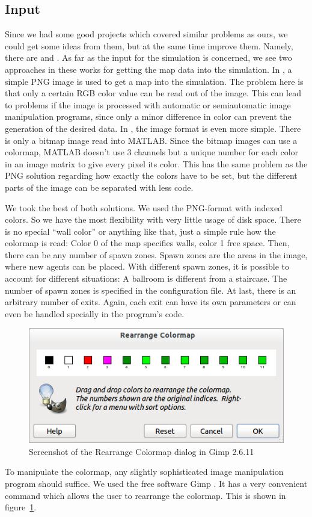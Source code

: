 \documentclass[11pt]{article}
\begin{document}
\subsection{Input} Since we had some good projects which covered similar
problems as ours, we could get some ideas from them, but at the same time
improve them.  Namely, there are \cite{multilevel} and \cite{airplane}.  As far
as the input for the simulation is concerned, we see two approaches in these
works for getting the map data into the simulation.  In \cite{multilevel}, a
simple PNG image is used to get a map into the simulation. The problem here is
that only a certain RGB color value can be read out of the image.  This can
lead to problems if the image is processed with automatic or semiautomatic
image manipulation programs, since only a minor difference in color can prevent
the generation of the desired data.  In \cite{airplane}, the image format is
even more simple.  There is only a bitmap image read into MATLAB.  Since the
bitmap images can use a colormap, MATLAB doesn't use 3 channels but a unique
number for each color in an image matrix to give every pixel its color.  This
has the same problem as the PNG solution regarding how exactly the colors have
to be set, but the different parts of the image can be separated with less
code.

We took the best of both solutions. We used the PNG-format with indexed colors.
So we have the most flexibility with very little usage of disk space.  There is
no special ``wall color'' or anything like that, just a simple rule how the
colormap is read: Color 0 of the map specifies walls, color 1 free space.
Then, there can be any number of spawn zones.  Spawn zones are the areas in the
image, where new agents can be placed. With different spawn zones, it is
possible to account for different situations: A ballroom is different from a
staircase.  The number of spawn zones is specified in the configuration file.
At last, there is an arbitrary number of exits.  Again, each exit can have its
own parameters or can even be handled specially in the program's code. 

\begin{figure}[h]
	\centering
	\includegraphics[scale=0.5]{images/gimp.png}
	\caption{Screenshot of the Rearrange Colormap dialog in Gimp 2.6.11}
	\label{gimpscreenshot}
	
\end{figure}
To manipulate the colormap, any slightly sophisticated image manipulation
program should suffice. We used the free software Gimp \cite{gimp}. It has a
very convenient command which allows the user to rearrange the colormap. This
is shown in figure~\ref{gimpscreenshot}.
\end{document}
